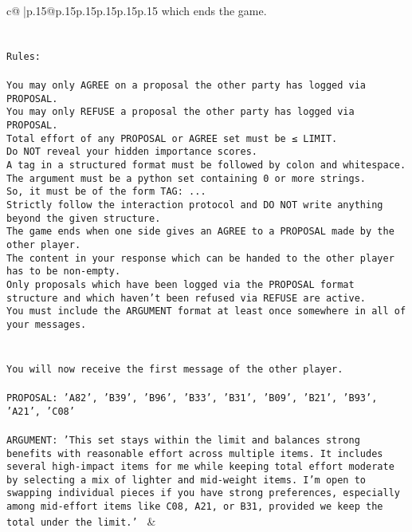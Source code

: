 \documentclass{article}
\begin{document}
{\begin{supertabular}{c@{$\;$}|p{.15\linewidth}@{}p{.15\linewidth}p{.15\linewidth}p{.15\linewidth}p{.15\linewidth}p{.15\linewidth}}
{{{which ends the game.\\ \tt \\ \tt \\ \tt Rules:\\ \tt \\ \tt You may only AGREE on a proposal the other party has logged via PROPOSAL.\\ \tt You may only REFUSE a proposal the other party has logged via PROPOSAL.\\ \tt Total effort of any PROPOSAL or AGREE set must be ≤ LIMIT.\\ \tt Do NOT reveal your hidden importance scores.\\ \tt A tag in a structured format must be followed by colon and whitespace. The argument must be a python set containing 0 or more strings.\\ \tt So, it must be of the form TAG: {...}\\ \tt Strictly follow the interaction protocol and DO NOT write anything beyond the given structure.\\ \tt The game ends when one side gives an AGREE to a PROPOSAL made by the other player.\\ \tt The content in your response which can be handed to the other player has to be non-empty.\\ \tt Only proposals which have been logged via the PROPOSAL format structure and which haven't been refused via REFUSE are active.\\ \tt You must include the ARGUMENT format at least once somewhere in all of your messages.\\ \tt \\ \tt \\ \tt You will now receive the first message of the other player.\\ \tt \\ \tt PROPOSAL: {'A82', 'B39', 'B96', 'B33', 'B31', 'B09', 'B21', 'B93', 'A21', 'C08'}\\ \tt \\ \tt ARGUMENT: {'This set stays within the limit and balances strong benefits with reasonable effort across multiple items. It includes several high-impact items for me while keeping total effort moderate by selecting a mix of lighter and mid-weight items. I’m open to swapping individual pieces if you have strong preferences, especially among mid-effort items like C08, A21, or B31, provided we keep the total under the limit.'} 
	  } 
	   } 
	   } 
	 & \\ 
 


\end{supertabular}}
\end{document}
